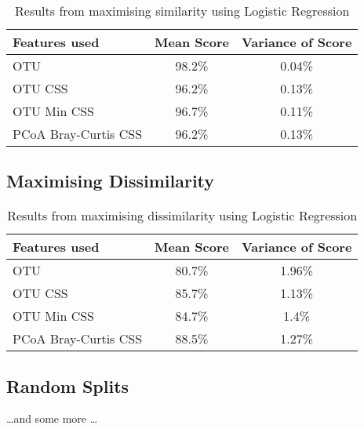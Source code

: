 \begin{table}
\caption{Results from maximising similarity using Logistic Regression}
\centering
\label{table:similarity}
\begin{tabular}{l c  c}
\hline 
Features used & Mean Score & Variance of Score \\ 
 
\hline
OTU & 98.2\% & 0.04\%   \\
OTU CSS & 96.2\% & 0.13\%   \\
OTU Min CSS & 96.7\% & 0.11\%   \\
PCoA Bray-Curtis CSS &96.2\% & 0.13\%   \\

\hline 
\end{tabular}
\end{table}


\subsection{Maximising Dissimilarity}

\begin{table}[h]
\caption{Results from maximising dissimilarity using Logistic Regression}
\centering
\label{table:dissimilarity}
\begin{tabular}{l c  c}
\hline 
Features used & Mean Score & Variance of Score \\ 
 
\hline
OTU & 80.7\% & 1.96\%   \\
OTU CSS & 85.7\% & 1.13\%   \\
OTU Min CSS & 84.7\% & 1.4\%   \\
PCoA Bray-Curtis CSS &88.5\% & 1.27\%   \\

\hline 
\end{tabular}
\end{table} 
\subsection{Random Splits}
\dots and some more \dots




